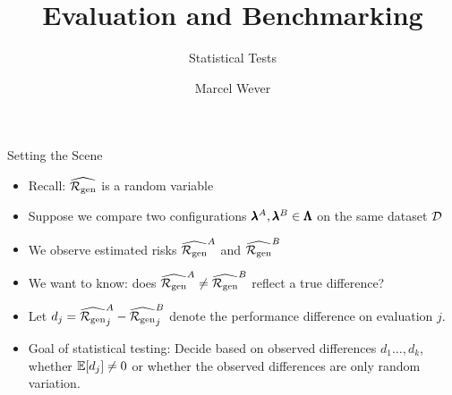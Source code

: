\documentclass[main]{subfiles}
\title[Evaluation and Benchmarking]{Evaluation and Benchmarking}
\subtitle{Statistical Tests}
\author[Marcel Wever]{Marcel Wever}
\date{}
\begin{document}
	
	\maketitle
	

\begin{frame}{Setting the Scene}
\begin{itemize}
    \item Recall: $\widehat{\mathcal{R}_{\text{gen}}}$ is a random variable
    \item Suppose we compare two configurations $\pmb{\lambda}^A, \pmb{\lambda}^B \in \pmb{\Lambda}$ on the same dataset $\mathcal{D}$
    \item We observe estimated risks $\widehat{\mathcal{R}_{\text{gen}}}^A$ and $\widehat{\mathcal{R}_{\text{gen}}}^B$
    \item We want to know: does $\widehat{\mathcal{R}_{\text{gen}}}^A \neq \widehat{\mathcal{R}_{\text{gen}}}^B$ reflect a true difference?
\end{itemize}
\vspace{.4cm}
\begin{itemize}
    \item Let $d_j = \widehat{\mathcal{R}_{\text{gen}}}_j^A - \widehat{\mathcal{R}_{\text{gen}}}_j^B$ denote the performance difference on evaluation $j$.\\
    \item \alert{Goal of statistical testing}: Decide based on observed differences $d_1 \ldots, d_k$, whether $\mathbb{E}[d_j] \neq 0$ or whether the observed differences are only random variation.
\end{itemize}
\end{frame}
\end{document}
